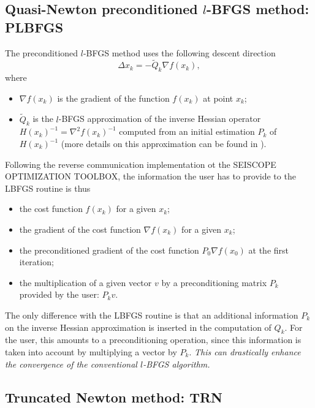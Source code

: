 \documentclass[a4paper,twoside,final,onecolumn,11pt,openright]{article}
\begin{document}
\subsection{Quasi-Newton preconditioned $l$-BFGS method: PLBFGS}

The preconditioned $l$-BFGS method uses the following descent direction
\begin{equation}
 \Delta x_k=-\tilde{Q}_k\nabla f(x_k),
\end{equation}
where 
\begin{itemize}
 \item $\nabla f(x_k)$ is the gradient of the function $f(x_k)$ at point $x_k$;
 \item $\tilde{Q}_k$ is the $l$-BFGS approximation of the inverse Hessian operator $H(x_k)^{-1}=\nabla^2 f(x_k)^{-1}$ computed from an initial estimation $P_k$ of $H(x_k)^{-1}$ (more details on this approximation can be found in \citet{Byrd_1995_LMB,Nocedal_2006_NO}). 
\end{itemize}
Following the reverse communication implementation ot the SEISCOPE OPTIMIZATION TOOLBOX, the information the user has to provide to the LBFGS routine is thus 
\begin{itemize}
 \item the cost function $f(x_k)$ for  a given $x_k$;
 \item the gradient of the cost function $\nabla f(x_k)$ for  a given $x_k$;
 \item the preconditioned gradient of the cost function $P_0\nabla f(x_0)$ at the first iteration; 
 \item the multiplication of a given vector $v$ by a preconditioning matrix $P_k$ provided by the user: $P_kv$.
\end{itemize}
The only difference with the LBFGS routine is that an additional information $P_k$ on the inverse Hessian approximation is inserted in the computation of $Q_k$. For the user, this amounts to a preconditioning operation, since this information is taken into account by multiplying a vector by $P_k$. \textit{This can drastically enhance the convergence of the conventional $l$-BFGS algorithm.} 

\subsection{Truncated Newton method: TRN}
\end{document}
